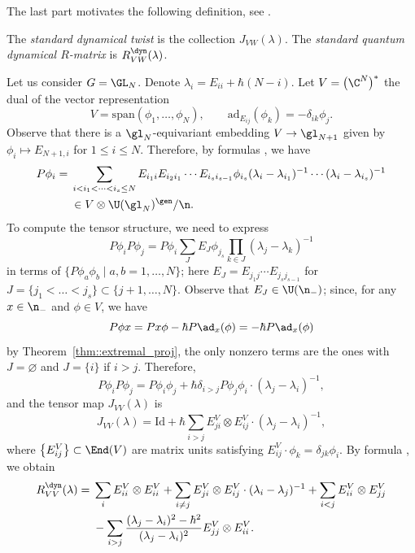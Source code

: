 	The last part motivates the following definition, see \cite{EtingofVarchenkoExchange}.
	\begin{Definition}
		\label{def::standard_dyn_twist}
		The \emph{standard dynamical twist} is the collection $J_{VW}(\lambda)$. The \emph{standard quantum dynamical $R$-matrix} is $R^{\dyn}_{VW}(\lambda)$.
	\end{Definition}
	
	\begin{Example}
		\label{ex:vector_rep_dynamical}
		Let us consider $G= \GL_N$. Denote $\lambda_i = E_{ii} + \hbar (N-i)$. Let $V= \bigl(\C^N\bigr)^*$ the dual of the vector representation
		\[
		V = \mathrm{span}(\phi_1,\dots,\phi_N), \qquad \mathrm{ad}_{E_{ij}}(\phi_k) = -\delta_{ik} \phi_j.
		\]
		Observe that there is a $\gl_N$-equivariant embedding $V \rightarrow \gl_{N+1}$ given by $\phi_i \mapsto E_{N+1,i}$ for $1\leq i \leq N$. Therefore, by formulas \cite[equations~(3.2) and (3.3)]{MolevTransvectorAlgebras}, we have
		\begin{align}
			\label{eq::n_invariant_vectors}
			P \phi_i={}& \sum\limits_{i < i_1 < \dots < i_s \leq N} E_{i_1 i} E_{i_2 i_1} \cdots E_{i_s i_{s-1}} \phi_{i_s} (\lambda_i - \lambda_{i_1})^{-1} \cdots (\lambda_i - \lambda_{i_s})^{-1}\nonumber \\
&{}\in V \otimes \U(\gl_N)^{\gen} /\n.
		\end{align}
		To compute the tensor structure, we need to express
		\[
		P \phi_i P \phi_j = P\phi_i \sum\limits_J E_J \phi_{j_s} \prod_{k\in J} (\lambda_j - \lambda_k)^{-1}
		\]
		in terms of $\{P\phi_a \phi_b \mid a,b=1,\dots, N\}$; here $E_J = E_{j_1 j} \cdots E_{j_s j_{s-1}}$ for $J = \{j_1 <\dots < j_s\}\subset \{j+1,\dots,N\}$. Observe that $E_J \in \U(\n_-)$; since, for any $x\in \n_-$ and $\phi\in V$, we have
		\[
		P\phi x = Px \phi - \hbar P \ad_x(\phi) = -\hbar P\ad_x(\phi)
		\]
		by Theorem~\ref{thm::extremal_proj}, the only nonzero terms are the ones with $J=\varnothing$ and $J=\{i\}$ if $i>j$. Therefore,
		\[
		P\phi_i P\phi_j = P\phi_i \phi_j + \hbar \delta_{i>j} P \phi_j \phi_i \cdot (\lambda_j - \lambda_i)^{-1},
		\]
		and the tensor map $J_{VV}(\lambda)$ is
		\[
			J_{VV}(\lambda) = \mathrm{Id} + \hbar \sum_{i>j} E^V_{ji} \otimes E^V_{ij} \cdot (\lambda_j - \lambda_i)^{-1},
		\]
		where $\bigl\{ E_{ij}^V \bigr\} \subset \End(V)$ are matrix units satisfying $E^V_{ij}\cdot \phi_k = \delta_{jk} \phi_i$. By formula \cite[equation~(36)]{EtingofVarchenkoExchange}, we obtain
		\begin{align*}
			R^{\dyn}_{VV}(\lambda) ={}& \sum\limits_i E^V_{ii} \otimes E^V_{ii} + \sum_{i\neq j} E^V_{ji} \otimes E^V_{ij} \cdot (\lambda_i - \lambda_j)^{-1} + \sum_{i <j} E^V_{ii} \otimes E^V_{jj}\\& - \sum_{i>j} \frac{(\lambda_j - \lambda_i)^2-\hbar^2}{(\lambda_j-\lambda_i)^2} E^V_{jj} \otimes E^V_{ii}.
		\end{align*}
	\end{Example}
	
